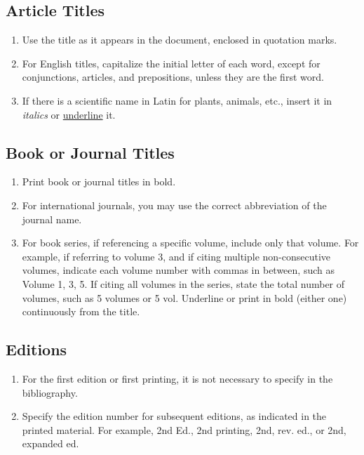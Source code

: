 \subsection{Article Titles}

\begin{enumerate}
    \item Use the title as it appears in the document, enclosed in quotation marks.
    \item For English titles, capitalize the initial letter of each word, except for conjunctions, articles, and prepositions, unless they are the first word.
    \item If there is a scientific name in Latin for plants, animals, etc., insert it in \textit{italics} or \underline{underline} it.
\end{enumerate}

\subsection{Book or Journal Titles}

\begin{enumerate}
    \item Print book or journal titles in bold.
    \item For international journals, you may use the correct abbreviation of the journal name.
    \item For book series, if referencing a specific volume, include only that volume. For example, if referring to volume 3, and if citing multiple non-consecutive volumes, indicate each volume number with commas in between, such as Volume 1, 3, 5. If citing all volumes in the series, state the total number of volumes, such as 5 volumes or 5 vol. Underline or print in bold (either one) continuously from the title.
\end{enumerate}

\subsection{Editions}

\begin{enumerate}
    \item For the first edition or first printing, it is not necessary to specify in the bibliography.
    \item Specify the edition number for subsequent editions, as indicated in the printed material. For example, 2nd Ed., 2nd printing, 2nd, rev. ed., or 2nd, expanded ed.
\end{enumerate}

